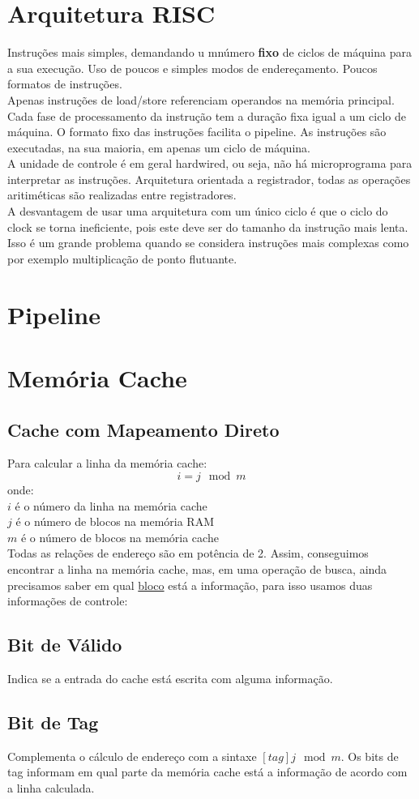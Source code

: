 \documentclass{article}
\begin{document}
	\section{Arquitetura RISC}
		Instruções mais simples, demandando u mnúmero \textbf{fixo} de ciclos de máquina para a sua execução. Uso de poucos e simples modos de endereçamento. Poucos formatos de instruções.\\
		Apenas instruções de load/store referenciam operandos na memória principal. Cada fase de processamento da instrução tem a duração fixa igual a um ciclo de máquina. O formato fixo das instruções facilita o pipeline. As instruções são executadas, na sua maioria, em apenas um ciclo de máquina.\\
		A unidade de controle é em geral hardwired, ou seja, não há microprograma para interpretar as instruções. Arquitetura orientada a registrador, todas as operações aritiméticas são realizadas entre registradores.\\
		A desvantagem de usar uma arquitetura com um único ciclo é que o ciclo do clock se torna ineficiente, pois este deve ser do tamanho da instrução mais lenta. Isso é um grande problema quando se considera instruções mais complexas como por exemplo multiplicação de ponto flutuante.
	
	\section{Pipeline}
	\section{Memória Cache}
		\subsection{Cache com Mapeamento Direto}
			Para calcular a linha da memória cache:
			$$i = j \mod m$$
			onde:\\
			$i$ é o número da linha na memória cache\\
			$j$ é o número de blocos na memória RAM\\
			$m$ é o número de blocos na memória cache\\
			Todas as relações de endereço são em potência de 2. Assim, conseguimos encontrar a linha na memória cache, mas, em uma operação de busca, ainda precisamos saber em qual \underline{bloco} está a informação, para isso usamos duas informações de controle:			
		\subsection{Bit de Válido}
			Indica se a entrada do cache está escrita com alguma informação.
		\subsection{Bit de Tag}
			Complementa o cálculo de endereço com a sintaxe $[tag]j \mod m$. Os bits de tag informam em qual parte da memória cache está a informação de acordo com a linha calculada.
\end{document}
